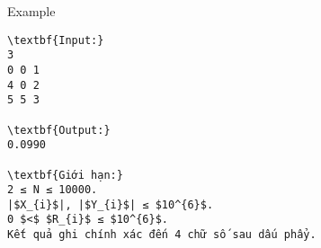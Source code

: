 Example
\begin{verbatim}
\textbf{Input:}
3
0 0 1
4 0 2
5 5 3

\textbf{Output:}
0.0990

\textbf{Giới hạn:}
2 ≤ N ≤ 10000. 
|$X_{i}$|, |$Y_{i}$| ≤ $10^{6}$.
0 $<$ $R_{i}$ ≤ $10^{6}$. 
Kết quả ghi chính xác đến 4 chữ số sau dấu phẩy.
\end{verbatim}
